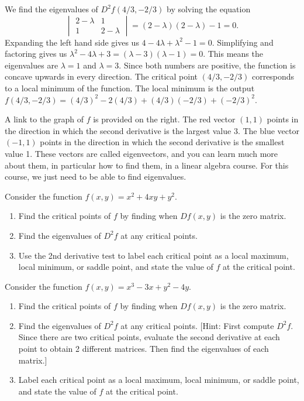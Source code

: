 \begin{example}
{}
We find the eigenvalues of $D^2 f(4/3,-2/3)$ by solving the equation 
$$\begin{vmatrix}2-\lambda&1 \\1&2-\lambda\end{vmatrix} = (2-\lambda)(2-\lambda)-1=0.$$ 
 Expanding the left hand side gives us {$4-4\lambda + \lambda^2 -1 = 0$}. Simplifying and factoring gives us $\lambda^2-4\lambda +3 = (\lambda-3)(\lambda -1) = 0$. This means the eigenvalues are $\lambda = 1$ and $\lambda=3$. Since both numbers are positive, the function is concave upwards in every direction.  The critical point $(4/3,-2/3)$ corresponds to a local minimum of the function. The local minimum is the output $f(4/3,-2/3) = (4/3)^2-2(4/3)+(4/3)(-2/3)+(-2/3)^2$.

A link to the graph of $f$ is provided on the right. 
The red vector $(1,1)$ points in the direction in which the second derivative is the largest value 3. 
The blue vector $(-1,1)$ points in the direction in which the second derivative is the smallest value 1.
These vectors are called eigenvectors, and you can learn much more about them, in particular how to find them, in a linear algebra course. For this course, we just need to be able to find eigenvalues.
\end{example}
 

\begin{problem}
%
Consider the function $f(x,y)=x^2+4xy+y^2$.  
\begin{enumerate}
 \item Find the critical points of $f$ by finding when $Df(x,y)$ is the zero matrix.
 \item Find the eigenvalues of $D^2f$ at any critical points.
 \item Use the 2nd derivative test to label each critical point as a local maximum, local minimum, or saddle point, and state the value of $f$ at the critical point.
\end{enumerate}
\end{problem}


\begin{problem}
Consider the function $f(x,y)=x^3-3x+y^2-4y$.  
\begin{enumerate}
 \item Find the critical points of $f$ by finding when $Df(x,y)$ is the zero matrix.
 \item Find the eigenvalues of $D^2f$ at any critical points. [Hint: First compute $D^2f$. Since there are two critical points, evaluate the second derivative at each point to obtain 2 different matrices. Then find the eigenvalues of each matrix.]
 \item Label each critical point as a local maximum, local minimum, or saddle point, and state the value of $f$ at the critical point.
\end{enumerate}
\end{problem}

